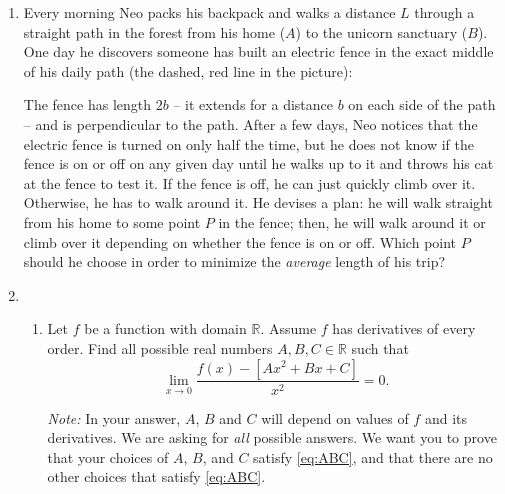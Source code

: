 \documentclass[12pt]{exam}
\newcommand{\vv}{\vspace{.1cm}}
\newcommand{\R}{\mathbb{R}}
\begin{document}
\begin{enumerate}

\item Every morning Neo packs his backpack and walks a distance $L$ through a straight path in the forest from his home ($A$) to the unicorn sanctuary ($B$).  One day he discovers someone has built an electric fence in the exact middle of his daily path (the dashed, red line in the picture):
\begin{center}
\end{center}
The fence has length $2b$ --  it extends for a distance $b$ on each side of the path -- and is perpendicular to the path.  After a few days, Neo notices that the electric fence is turned on only half the time, but he does not know if the fence is on or off on any given day until he walks up to it and throws his cat at the fence to test it.  If the fence is off, he can just quickly climb over it.  Otherwise, he has to walk around it.  He devises a plan: he will walk straight from his home to some point $P$ in the fence; then, he will walk around it or climb over it depending on whether the fence is on or off.    Which point $P$ should he choose in order to minimize the \emph{average} length of his trip?


\vv

\item  
	\begin{enumerate}
				
		\item  Let $f$ be a function with domain $\R$.  Assume $f$ has derivatives of every order.  Find all possible real numbers $A, B, C \in \R$ such that
			\begin{equation} \label{eq:ABC}
				\lim_{x \to 0} \frac{f(x) - \left[ Ax^2 + B x + C \right]}{x^2} = 0.
			\end{equation}	
			
			\emph{Note:} In your answer, $A$, $B$ and $C$ will depend on values of $f$ and its derivatives.  We are asking for \emph{all} possible answers.  We want you to prove that your choices of $A$, $B$, and $C$ satisfy \eqref{eq:ABC}, and that there are no other choices that satisfy \eqref{eq:ABC}.


\end{enumerate}
\end{enumerate}
\end{document}
